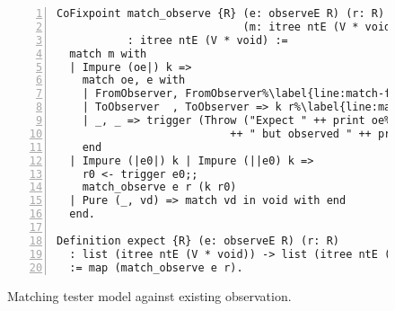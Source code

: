 \begin{figure}
\begin{lstlisting}[numbers=left]
CoFixpoint match_observe {R} (e: observeE R) (r: R)
                             (m: itree ntE (V * void))
           : itree ntE (V * void) :=
  match m with
  | Impure (oe|) k =>
    match oe, e with
    | FromObserver, FromObserver%\label{line:match-from}%
    | ToObserver  , ToObserver => k r%\label{line:match-to}%
    | _, _ => trigger (Throw ("Expect " ++ print oe%\label{line:match-throw}%
                           ++ " but observed " ++ print e))
    end
  | Impure (|e0|) k | Impure (||e0) k =>
    r0 <- trigger e0;;
    match_observe e r (k r0)
  | Pure (_, vd) => match vd in void with end
  end.

Definition expect {R} (e: observeE R) (r: R)
  : list (itree ntE (V * void)) -> list (itree ntE (V * void))
  := map (match_observe e r).
\end{lstlisting}
\caption{Matching tester model against existing observation.}
\label{fig:match-observe}
\end{figure}

